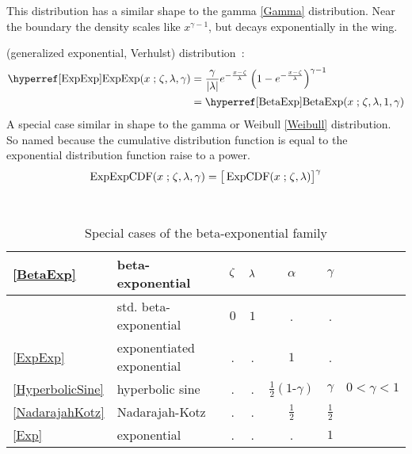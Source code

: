 This distribution has a similar shape to the gamma \eqref{Gamma} distribution. Near the boundary the density scales like $x^{\gamma-1}$, but decays exponentially in the wing.






 (generalized exponential, Verhulst) distribution~\cite{Verhulst1847,Ahuja1967,Gupta2001}:
\begin{align}
\label{ExpExp}
\opr{ExpExp}(x\given \pLoc,\pScale,\gamma) 
 &=  \frac{\gamma}{ \left|\pScale\right|}
 e^{- \frac{x-\pLoc}{\pScale} }  \left(1 - e^{-\frac{x-\pLoc}{\pScale}  }\right)^{\gamma-1} \checked
\\ & = \opr{BetaExp}(x\given \pLoc,\pScale,1, \gamma) \notag \checked
\end{align}
A special case similar in shape to the gamma or Weibull \eqref{Weibull} distribution. So named because the cumulative distribution function is equal to the exponential distribution function raise to a power.
\[
\op{ExpExpCDF}(x\given \pLoc,\pScale,\gamma) = \big[\op{ExpCDF}(x\given \pLoc,\pScale)\big]^{\gamma}
\checked
\]

\begin{table*}[bt]
\begin{center}
\caption[Beta-exponential distribution -- Special cases]{Special cases of the beta-exponential family}
~\\
{\renewcommand{\arraystretch}{1.25} 
\begin{tabular}{llccccl}
\eqref{BetaExp} & beta-exponential & $\zeta$ & $\lambda$ & $\alpha$ &  $\gamma$ \\
\hline  
 	& std. beta-exponential & $0$ & $1$ & . & . \\
\eqref{ExpExp} 		& exponentiated exponential & . & . & $1$ & . \\
\eqref{HyperbolicSine} & hyperbolic sine 	& . & .  & $\tfrac{1}{2}(1\text{-}\gamma)$ & $\gamma$ & $0<\gamma<1$ \\
\eqref{NadarajahKotz} &  Nadarajah-Kotz 	& . & . & $\tfrac{1}{2}$ & $\tfrac{1}{2}$ \\
\eqref{Exp} & exponential & . & . & . & $1$ \\
\end{tabular} }
\end{center}
\end{table*}

